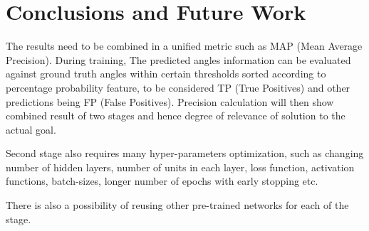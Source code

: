 \chapter{Conclusions and Future Work}
\label{chap:conclusions}

The results need to be combined in a unified metric such as MAP (Mean Average Precision). During training, The predicted angles information can be evaluated against ground truth angles within certain thresholds sorted according to percentage probability feature, to be considered TP (True Positives) and other predictions being FP (False Positives). Precision calculation will then show combined result of two stages and hence degree of relevance of solution to the actual goal.

Second stage also requires many hyper-parameters optimization, such as changing number of hidden layers, number of units in each layer, loss function, activation functions, batch-sizes, longer number of epochs with early stopping etc. 

There is also a possibility of reusing other pre-trained networks for each of the stage.